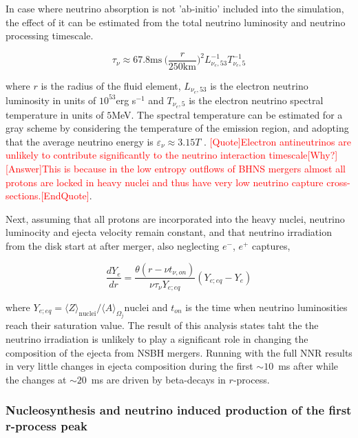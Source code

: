 \documentclass[11pt,a4paper,headinclude=true,DIV=14,BCOR=8mm,chapterprefix,listof=totoc,twoside,openright,abstracton]{scrbook}
\newcommand{\red}[1]{\textcolor{red}{#1}}
\begin{document}
In case where neutrino absorption is not 'ab-initio' included into the simulation, the effect of it can be estimated from the total neutrino luminosity and neutrino processing timescale. 

\begin{equation}
    \tau_{\nu} \approx 67.8 \text{ms} \: \Big(\frac{r}{250\text{km}}\Big)^2 L_{\nu_e, 53}^{-1} T_{\nu_e, 5}^{-1}
\end{equation}

where $r$ is the radius of the fluid element, $L_{\nu_e, 53}$ is the electron neutrino luminosity in units of $10^{53}$erg s$^{-1}$ and $T_{\nu_e,5}$ is the electron neutrino spectral temperature in units of $5$MeV. The spectral temperature can be estimated for a gray scheme by considering the temperature of the emission region, and adopting that the average neutrino energy is $\varepsilon_{\nu} \approx 3.15T$ \cite{(e.g., Foucart et al., 2015).}. \red{[Quote]Electron antineutrinos are unlikely to contribute significantly to the neutrino interaction timescale[Why?]} \red{[Answer]This is because in the low entropy outflows of BHNS mergers almost all protons are locked in heavy nuclei and thus have very low neutrino capture cross-sections.[EndQuote]}.

Next, assuming that all protons are incorporated into the heavy nuclei, neutrino luminocity and ejecta velocity remain constant, and that neutrino irradiation from the disk start at after merger, also neglecting $e^{-}$, $e^{+}$ captures, 

\begin{equation}
    \frac{d Y_e}{dr} = \frac{\theta(r - \nu t_{\nu, on})}{\nu \tau_{\nu} Y_{e; eq}}(Y_{e; eq} - Y_e)
\end{equation}

where $Y_{e; eq} = \langle Z \rangle_{\text{nuclei}} / \langle A \rangle_{\Omega_j}\text{nuclei}$ and $t_{on}$ is the time when neutrino luminosities reach their saturation value.
The result of this analysis states taht the the neutrino irradiation is unlikely to play a significant role in changing the composition of the ejecta from NSBH mergers.
Running with the full NNR results in very little changes in ejecta composition during the first $\sim10$~ms after while the changes at $\sim20$~ms are driven by beta-decays in $r$-process.


\subsubsection{Nucleosynthesis and neutrino induced production of the first r-process peak}
\end{document}
